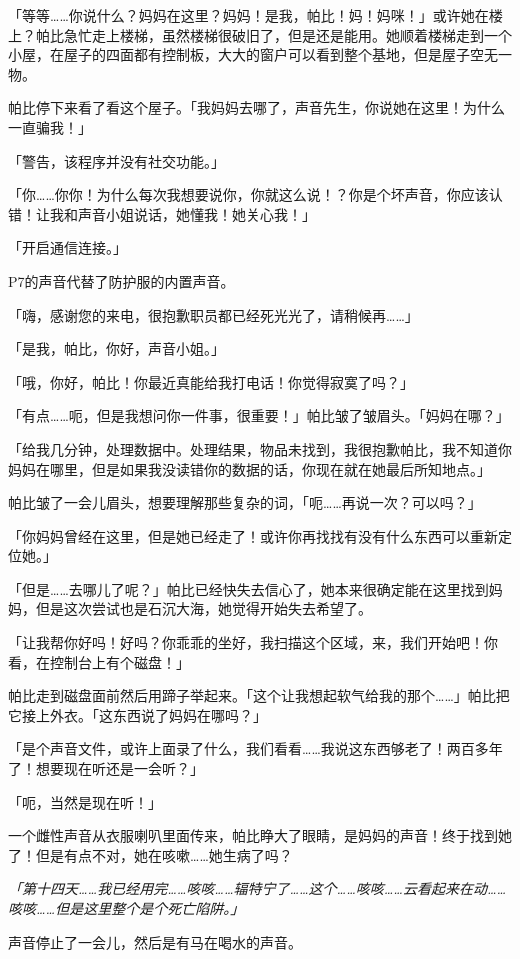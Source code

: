 「等等……你说什么？妈妈在这里？妈妈！是我，帕比！妈！妈咪！」或许她在楼上？帕比急忙走上楼梯，虽然楼梯很破旧了，但是还是能用。她顺着楼梯走到一个小屋，在屋子的四面都有控制板，大大的窗户可以看到整个基地，但是屋子空无一物。

帕比停下来看了看这个屋子。「我妈妈去哪了，声音先生，你说她在这里！为什么一直骗我！」

「{\mt 警告，该程序并没有社交功能。}」

「你……你你！为什么每次我想要说你，你就这么说！？你是个坏声音，你应该认错！让我和声音小姐说话，她懂我！她关心我！」

「{\mt 开启通信连接。}」

P7的声音代替了防护服的内置声音。

「嗨，感谢您的来电，很抱歉职员都已经死光光了，请稍候再……」

「是我，帕比，你好，声音小姐。」

「哦，你好，帕比！你最近真能给我打电话！你觉得寂寞了吗？」

「有点……呃，但是我想问你一件事，很重要！」帕比皱了皱眉头。「妈妈在哪？」

「给我几分钟，处理数据中。处理结果，物品未找到，我很抱歉帕比，我不知道你妈妈在哪里，但是如果我没读错你的数据的话，你现在就在她最后所知地点。」

帕比皱了一会儿眉头，想要理解那些复杂的词，「呃……再说一次？可以吗？」

「你妈妈曾经在这里，但是她已经走了！或许你再找找有没有什么东西可以重新定位她。」

「但是……去哪儿了呢？」帕比已经快失去信心了，她本来很确定能在这里找到妈妈，但是这次尝试也是石沉大海，她觉得开始失去希望了。

「让我帮你好吗！好吗？你乖乖的坐好，我扫描这个区域，来，我们开始吧！你看，在控制台上有个磁盘！」

帕比走到磁盘面前然后用蹄子举起来。「这个让我想起软气给我的那个……」帕比把它接上外衣。「这东西说了妈妈在哪吗？」

「是个声音文件，或许上面录了什么，我们看看……我说这东西够老了！两百多年了！想要现在听还是一会听？」

「呃，当然是现在听！」

一个雌性声音从衣服喇叭里面传来，帕比睁大了眼睛，是妈妈的声音！终于找到她了！但是有点不对，她在咳嗽……她生病了吗？

\emph{「第十四天……我已经用完……咳咳……辐特宁了……这个……咳咳……云看起来在动……咳咳……但是这里整个是个死亡陷阱。」}

声音停止了一会儿，然后是有马在喝水的声音。

